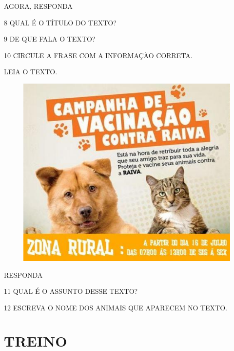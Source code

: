 AGORA, RESPONDA

\num{8} QUAL É O TÍTULO DO TEXTO?


\num{9} DE QUE FALA O TEXTO?


\num{10} CIRCULE A FRASE COM A INFORMAÇÃO CORRETA.

\pagebreak

LEIA O TEXTO.

\begin{figure}[htpb!]
\includegraphics[width=\textwidth]{media/image165.jpg}
\end{figure}


RESPONDA

\num{11} QUAL É O ASSUNTO DESSE TEXTO?


\num{12} ESCREVA O NOME DOS ANIMAIS QUE APARECEM NO TEXTO.


\pagebreak
\section{TREINO}

